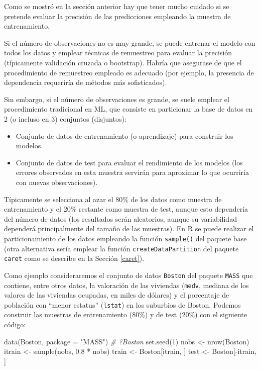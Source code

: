 \documentclass[
  spanish,
]{book}
\newenvironment{Shaded}{\begin{snugshade}}{\end{snugshade}}
\newcommand{\AttributeTok}[1]{\textcolor[rgb]{0.77,0.63,0.00}{#1}}
\newcommand{\CommentTok}[1]{\textcolor[rgb]{0.56,0.35,0.01}{\textit{#1}}}
\newcommand{\DecValTok}[1]{\textcolor[rgb]{0.00,0.00,0.81}{#1}}
\newcommand{\FloatTok}[1]{\textcolor[rgb]{0.00,0.00,0.81}{#1}}
\newcommand{\FunctionTok}[1]{\textcolor[rgb]{0.00,0.00,0.00}{#1}}
\newcommand{\NormalTok}[1]{#1}
\newcommand{\OtherTok}[1]{\textcolor[rgb]{0.56,0.35,0.01}{#1}}
\newcommand{\SpecialCharTok}[1]{\textcolor[rgb]{0.00,0.00,0.00}{#1}}
\newcommand{\StringTok}[1]{\textcolor[rgb]{0.31,0.60,0.02}{#1}}
\theoremstyle{break}
\theoremstyle{definition}
\theoremstyle{definition}
\theoremstyle{definition}
\theoremstyle{definition}
\theoremstyle{remark}
\begin{document}
Como se mostró en la sección anterior hay que tener mucho cuidado si se pretende evaluar la precisión de las predicciones empleando la muestra de entrenamiento.

Si el número de observaciones no es muy grande, se puede entrenar el modelo con todos los datos y emplear técnicas de remuestreo para evaluar la precisión (típicamente validación cruzada o bootstrap).
Habría que asegurase de que el procedimiento de remuestreo empleado es adecuado (por ejemplo, la presencia de dependencia requeriría de métodos más sofisticados).

Sin embargo, si el número de observaciones es grande, se suele emplear el procedimiento tradicional en ML, que consiste en particionar la base de datos en 2 (o incluso en 3) conjuntos (disjuntos):

\begin{itemize}
\item
  Conjunto de datos de entrenamiento (o aprendizaje) para construir los modelos.
\item
  Conjunto de datos de test para evaluar el rendimiento de los modelos (los errores observados en esta muestra servirán para aproximar lo que ocurriría con nuevas observaciones).
\end{itemize}

Típicamente se selecciona al azar el 80\% de los datos como muestra de entrenamiento y el 20\% restante como muestra de test, aunque esto dependería del número de datos (los resultados serán aleatorios, aunque su variabilidad dependerá principalmente del tamaño de las muestras).
En R se puede realizar el particionamiento de los datos empleando la función \texttt{sample()} del paquete base (otra alternativa sería emplear la función \texttt{createDataPartition} del paquete \texttt{caret} como se describe en la Sección \ref{caret}).

Como ejemplo consideraremos el conjunto de datos \texttt{Boston} del paquete \texttt{MASS} que contiene, entre otros datos, la valoración de las viviendas (\texttt{medv}, mediana de los valores de las viviendas ocupadas, en miles de dólares) y el porcentaje de población con ``menor estatus'' (\texttt{lstat}) en los suburbios de Boston.
Podemos construir las muestras de entrenamiento (80\%) y de test (20\%) con el siguiente código:

\begin{Shaded}
\begin{Highlighting}[]
\FunctionTok{data}\NormalTok{(Boston, }\AttributeTok{package =} \StringTok{"MASS"}\NormalTok{)}
\CommentTok{\# ?Boston}
\FunctionTok{set.seed}\NormalTok{(}\DecValTok{1}\NormalTok{)}
\NormalTok{nobs }\OtherTok{\textless{}{-}} \FunctionTok{nrow}\NormalTok{(Boston)}
\NormalTok{itrain }\OtherTok{\textless{}{-}} \FunctionTok{sample}\NormalTok{(nobs, }\FloatTok{0.8} \SpecialCharTok{*}\NormalTok{ nobs)}
\NormalTok{train }\OtherTok{\textless{}{-}}\NormalTok{ Boston[itrain, ]}
\NormalTok{test }\OtherTok{\textless{}{-}}\NormalTok{ Boston[}\SpecialCharTok{{-}}\NormalTok{itrain, ]}
\end{Highlighting}
\end{Shaded}
\end{document}
